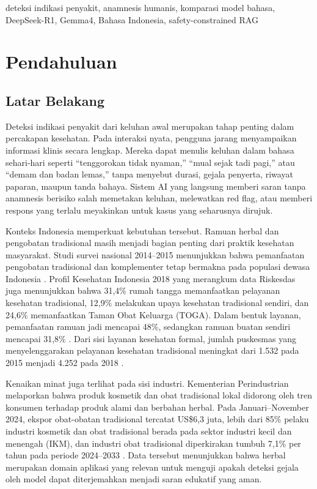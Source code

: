 \documentclass[conference]{IEEEtran}
\begin{document}
\begin{IEEEkeywords}
deteksi indikasi penyakit, anamnesis humanis, komparasi model bahasa, DeepSeek-R1, Gemma4, Bahasa Indonesia, safety-constrained RAG
\end{IEEEkeywords}

\section{Pendahuluan}

\subsection{Latar Belakang}

Deteksi indikasi penyakit dari keluhan awal merupakan tahap penting dalam percakapan kesehatan. Pada interaksi nyata, pengguna jarang menyampaikan informasi klinis secara lengkap. Mereka dapat menulis keluhan dalam bahasa sehari-hari seperti ``tenggorokan tidak nyaman,'' ``mual sejak tadi pagi,'' atau ``demam dan badan lemas,'' tanpa menyebut durasi, gejala penyerta, riwayat paparan, maupun tanda bahaya. Sistem AI yang langsung memberi saran tanpa anamnesis berisiko salah memetakan keluhan, melewatkan red flag, atau memberi respons yang terlalu meyakinkan untuk kasus yang seharusnya dirujuk.

Konteks Indonesia memperkuat kebutuhan tersebut. Ramuan herbal dan pengobatan tradisional masih menjadi bagian penting dari praktik kesehatan masyarakat. Studi survei nasional 2014--2015 menunjukkan bahwa pemanfaatan pengobatan tradisional dan komplementer tetap bermakna pada populasi dewasa Indonesia \cite{b1}. Profil Kesehatan Indonesia 2018 yang merangkum data Riskesdas juga menunjukkan bahwa 31,4\% rumah tangga memanfaatkan pelayanan kesehatan tradisional, 12,9\% melakukan upaya kesehatan tradisional sendiri, dan 24,6\% memanfaatkan Taman Obat Keluarga (TOGA). Dalam bentuk layanan, pemanfaatan ramuan jadi mencapai 48\%, sedangkan ramuan buatan sendiri mencapai 31,8\% \cite{b2}. Dari sisi layanan kesehatan formal, jumlah puskesmas yang menyelenggarakan pelayanan kesehatan tradisional meningkat dari 1.532 pada 2015 menjadi 4.252 pada 2018 \cite{b2}.

Kenaikan minat juga terlihat pada sisi industri. Kementerian Perindustrian melaporkan bahwa produk kosmetik dan obat tradisional lokal didorong oleh tren konsumen terhadap produk alami dan berbahan herbal. Pada Januari--November 2024, ekspor obat-obatan tradisional tercatat US\$6,3 juta, lebih dari 85\% pelaku industri kosmetik dan obat tradisional berada pada sektor industri kecil dan menengah (IKM), dan industri obat tradisional diperkirakan tumbuh 7,1\% per tahun pada periode 2024--2033 \cite{b3}. Data tersebut menunjukkan bahwa herbal merupakan domain aplikasi yang relevan untuk menguji apakah deteksi gejala oleh model dapat diterjemahkan menjadi saran edukatif yang aman.
\end{document}

